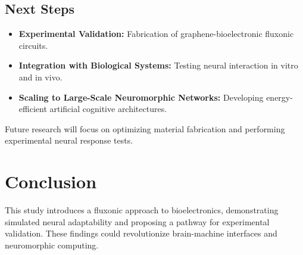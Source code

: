 \documentclass{article}
\begin{document}
\subsection{Next Steps}
\begin{itemize}
    \item \textbf{Experimental Validation:} Fabrication of graphene-bioelectronic fluxonic circuits.
    \item \textbf{Integration with Biological Systems:} Testing neural interaction in vitro and in vivo.
    \item \textbf{Scaling to Large-Scale Neuromorphic Networks:} Developing energy-efficient artificial cognitive architectures.
\end{itemize}
Future research will focus on optimizing material fabrication and performing experimental neural response tests.

\section{Conclusion}
This study introduces a fluxonic approach to bioelectronics, demonstrating simulated neural adaptability and proposing a pathway for experimental validation. These findings could revolutionize brain-machine interfaces and neuromorphic computing.
\end{document}
